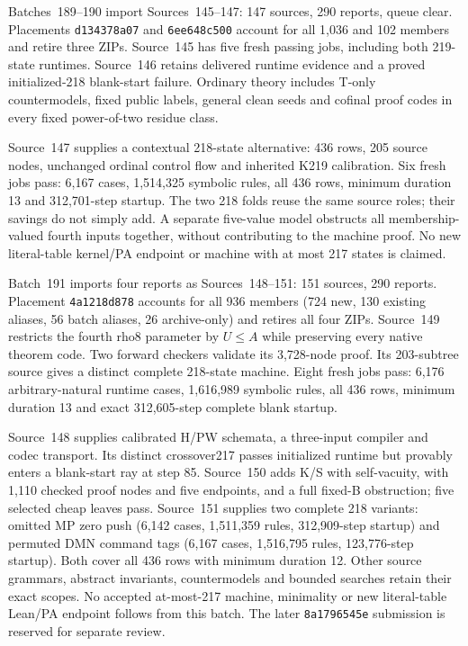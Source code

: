 \documentclass[11pt]{article}
\begin{document}
{Batches~189--190 import Sources~145--147: 147 sources, 290 reports, queue clear.
Placements \texttt{d134378a07} and \texttt{6ee648c500} account for all 1,036 and
102 members and retire three ZIPs. Source~145 has five fresh passing jobs,
including both 219-state runtimes. Source~146 retains delivered runtime evidence
and a proved initialized-218 blank-start failure. Ordinary theory includes
T-only countermodels, fixed public labels, general clean seeds and cofinal
proof codes in every fixed power-of-two residue class.

Source~147 supplies a contextual 218-state alternative: 436 rows, 205 source
nodes, unchanged ordinal control flow and inherited K219 calibration.
Six fresh jobs pass: 6,167 cases, 1,514,325 symbolic rules, all 436 rows,
minimum duration 13 and 312,701-step startup. The two 218 folds reuse the same
source roles; their savings do not simply add. A separate five-value model
obstructs all membership-valued fourth inputs together, without contributing
to the machine proof. No new literal-table kernel/PA endpoint or machine with
at most 217 states is claimed.

Batch~191 imports four reports as Sources~148--151: 151 sources, 290 reports.
Placement \texttt{4a1218d878} accounts for all 936 members (724 new, 130 existing
aliases, 56 batch aliases, 26 archive-only) and retires all four ZIPs. Source~149
restricts the fourth rho8 parameter by $U\leq A$ while preserving every native
theorem code. Two forward checkers validate its 3,728-node proof. Its 203-subtree
source gives a distinct complete 218-state machine. Eight fresh jobs pass:
6,176 arbitrary-natural runtime cases, 1,616,989 symbolic rules, all 436 rows,
minimum duration 13 and exact 312,605-step complete blank startup.

Source~148 supplies calibrated H/PW schemata, a three-input compiler and
codec transport. Its distinct crossover217 passes initialized runtime but
provably enters a blank-start ray at step 85. Source~150 adds K/S with
self-vacuity, with 1,110 checked proof nodes and five endpoints, and a full
fixed-B obstruction; five selected cheap leaves pass. Source~151 supplies two
complete 218 variants: omitted MP zero push (6,142 cases, 1,511,359 rules,
312,909-step startup) and permuted DMN command tags (6,167 cases, 1,516,795 rules,
123,776-step startup). Both cover all 436 rows with minimum duration 12.
Other source grammars, abstract invariants, countermodels and bounded searches
retain their exact scopes. No accepted at-most-217 machine, minimality or new
literal-table Lean/PA endpoint follows from this batch. The later
\texttt{8a1796545e} submission is reserved for separate review.

}
\end{document}
